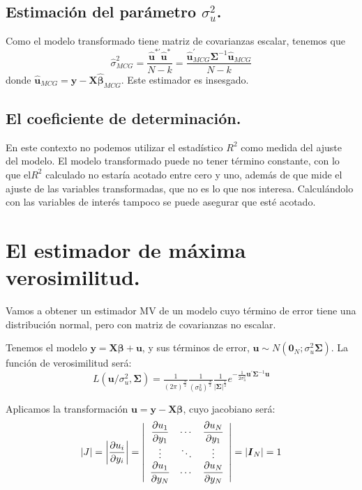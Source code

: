 \subsection{Estimaci\'on del par\'ametro $\sigma_{u}^{2}$.}

Como el modelo transformado tiene matriz de covarianzas escalar, tenemos
que 
\[
\hat{\sigma}_{MCG}^{2}=\dfrac{\hat{\boldsymbol{u}}^{*\prime}\hat{\boldsymbol{u}}^{*}}{N-k}=\dfrac{\hat{\boldsymbol{u}}_{MCG}^{\prime}\boldsymbol{\Sigma}^{-1}\hat{\boldsymbol{u}}_{MCG}}{N-k}
\]
 donde $\hat{\boldsymbol{u}}_{MCG}=\boldsymbol{y}-\boldsymbol{X}\hat{\boldsymbol{\beta}}_{MCG}$.
Este estimador es insesgado.


\subsection{El coeficiente de determinaci\'on.}

En este contexto no podemos utilizar el estad\'istico $R^{2}$ como
medida del ajuste del modelo. El modelo transformado puede no tener
t\'ermino constante, con lo que el$R^{2}$ calculado no estar\'ia acotado
entre cero y uno, adem\'as de que mide el ajuste de las variables transformadas,
que no es lo que nos interesa. Calcul\'andolo con las variables de inter\'es
tampoco se puede asegurar que est\'e acotado.


\section{El estimador de m\'axima verosimilitud.}

Vamos a obtener un estimador MV de un modelo cuyo t\'ermino de error
tiene una distribuci\'on normal, pero con matriz de covarianzas no escalar.

Tenemos el modelo $\boldsymbol{y}=\boldsymbol{X}\boldsymbol{\beta}+\boldsymbol{u}$,
y sus t\'erminos de error, $\boldsymbol{u}\sim N\left(\boldsymbol{0}_{N};\sigma_{u}^{2}\boldsymbol{\Sigma}\right)$.
La funci\'on de verosimilitud ser\'a:
\[
L\left(\boldsymbol{u}/\sigma_{u}^{2},\boldsymbol{\Sigma}\right)=\tfrac{1}{\left(2\pi\right)^{\frac{N}{2}}}\tfrac{1}{\left(\sigma_{u}^{2}\right)^{\frac{N}{2}}}\tfrac{1}{\left|\boldsymbol{\Sigma}\right|^{\frac{1}{2}}}e^{-\tfrac{1}{2\sigma_{u}^{2}}\boldsymbol{u}^{\prime}\boldsymbol{\Sigma}^{-1}\boldsymbol{u}}
\]


Aplicamos la transformaci\'on $\boldsymbol{u}=\boldsymbol{y}-\boldsymbol{X}\boldsymbol{\beta}$,
cuyo jacobiano ser\'a:
\[
\left|J\right|=\left|\dfrac{\partial u_{i}}{\partial y_{i}}\right|=\left|\begin{array}{ccc}
\dfrac{\partial u_{1}}{\partial y_{1}} & \text{\ensuremath{\cdots}} & \dfrac{\partial u_{N}}{\partial y_{1}}\\
\vdots & \ddots & \vdots\\
\dfrac{\partial u_{1}}{\partial y_{N}} & \cdots & \dfrac{\partial u_{N}}{\partial y_{N}}
\end{array}\right|=\left|\boldsymbol{I}_{N}\right|=1
\]


